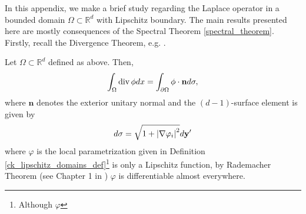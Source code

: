 

In this appendix, we make a brief study regarding the Laplace operator in a bounded domain \(\Omega \subset \mathbb{R}^d\) with Lipschitz boundary. The main results presented here are mostly consequences of the Spectral Theorem \ref{spectral_theorem}. Firstly, recall the Divergence Theorem, e.g. \cite{evans2015measure}.

\begin{theorem}\label{appendix_div_theor}
    Let \(\Omega \subset \mathbb{R}^d\) defined as above. Then,
    \[
      \int_\Omega \operatorname{div} \phi dx = \int_{\partial\Omega} \phi \cdot \mathbf{n} d\sigma,
    \]
    where \(\mathbf{n}\) denotes the exterior unitary normal and the \((d-1)\)-surface element is given by
    \[
        d\sigma = \sqrt{1+ \abs{\nabla \varphi_i}^2} d \mathbf{y}'
    \]
    where \(\varphi\) is the local parametrization given in Definition \ref{ck_lipschitz_domains_def}\footnote{Although \(\varphi\)} is only a Lipschitz function, by Rademacher Theorem (see Chapter 1 in \cite{salsa2016partial}) \(\varphi\) is differentiable almost everywhere.
\end{theorem}

